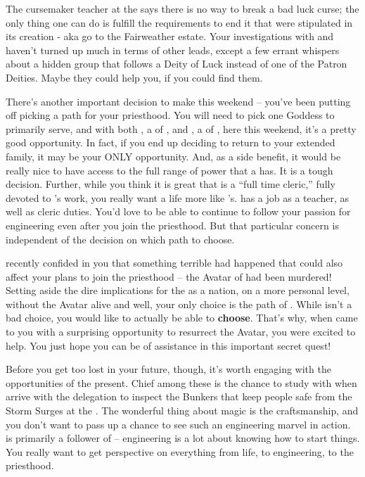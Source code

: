 \documentclass[char]{GL2020}
\begin{document}
The cursemaker teacher at the \pSchool{} says there is no way to break a bad luck curse; the only thing one can do is fulfill the requirements to end it that were stipulated in its creation - aka go to the Fairweather estate. Your investigations with \cPresident{} and \cWarlordDaughter{} haven't turned up much in terms of other leads, except a few errant whispers about a hidden group that follows a Deity of Luck instead of one of the Patron Deities. Maybe they could help you, if you could find them.

There's another important decision to make this weekend – you've been putting off picking a path for your priesthood. You will need to pick one Goddess to primarily serve, and with both \cEbbPriest{\full}, a \cEbbPriest{\cleric} of \cEbbFull{\full}, and \cFlowPriest{\full}, a \cFlowPriest{\cleric} of \cFlowFull{\full}, here this weekend, it's a pretty good opportunity. In fact, if you end up deciding to return to your extended family, it may be your ONLY opportunity. And, as a side benefit, it would be really nice to have access to the full range of power that a \cInitiate{\cleric} has. It is a tough decision. Further, while you think it is great that \cEbbPriest{} is a ``full time cleric,'' fully devoted to \cEbb{}'s work, you really want a life more like \cFlowPriest{\full}'s. \cFlowPriest{} has a job as a teacher, as well as \cFlowPriest{\their} cleric duties. You'd love to be able to continue to follow your passion for engineering even after you join the priesthood. But that particular concern is independent of the decision on which path to choose.

\cFlowPriest{} recently confided in you that something terrible had happened that could also affect your plans to join the priesthood – the Avatar of \cEbb{} had been murdered! Setting aside the dire implications for the \pShip{} as a nation, on a more personal level, without the \cEbb{} Avatar alive and well, your only choice is the path of \cFlow{}. While \cFlow{} isn't a bad choice, you would like to actually be able to \textbf{choose}. That's why, when \cFlowPriest{} came to you with a surprising opportunity to resurrect the Avatar, you were excited to help. You just hope you can be of assistance in this important secret quest!

Before you get too lost in your future, though, it's worth engaging with the opportunities of the present. Chief among these is the chance to study with \cBunker{\full} when \cBunker{\they} arrive\cBunker{\plural} with the \pShip{} delegation to inspect the Bunkers that keep people safe from the Storm Surges at the \pSc{}. The wonderful thing about \pShippie{} magic is the craftsmanship, and you don't want to pass up a chance to see such an engineering marvel in action. \cBunker{} is primarily a follower of \cFlow{} -- engineering is a lot about knowing how to start things. You really want to get \cBunker{\their} perspective on everything from life, to engineering, to the priesthood.
\end{document}
